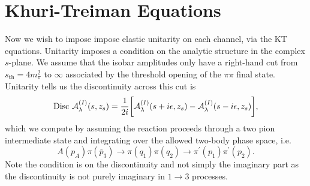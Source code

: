 \section{Khuri-Treiman Equations} \label{sec:unitarity}

Now we wish to impose impose elastic unitarity on each channel, via the KT equations.
Unitarity imposes a condition on the analytic structure in the complex \(s\)-plane. We assume that the isobar amplitudes only have a right-hand cut from \(s_\text{th} = 4m_\pi^2\) to \(\infty\) associated by the threshold opening of the \(\pi\pi\) final state. Unitarity tells us the discontinuity across this cut is
  \begin{equation}
      \text{Disc } \mathcal{A}^{(I)}_\lambda(s,z_s) = \frac{1}{2i} \bigg[ \mathcal{A}^{(I)}_\lambda(s + i\epsilon, z_s) - \mathcal{A}^{(I)}_\lambda(s-i\epsilon,z_s) \bigg],
  \end{equation}
which we compute by assuming the reaction proceeds through a two pion intermediate state and integrating over the allowed two-body phase space, i.e.
  \begin{equation}
    A(p_A) \pi(\overline{p}_3) \rightarrow \pi(q_1)\pi(q_2) \to \pi^\prime(p_1) \pi^\prime(p_2).
  \end{equation}
Note the condition is on the discontinuity and not simply the imaginary part as the discontinuity is not purely imaginary in \(1 \to 3\) processes.

